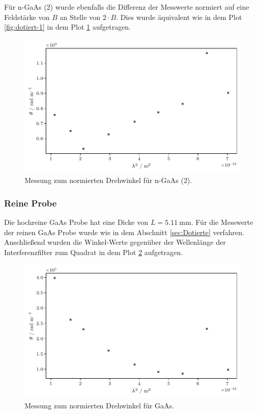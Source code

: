 Für n-GaAs (2) wurde ebenfalls die Differenz der Messwerte normiert auf eine Feldstärke von $B$ an Stelle von $2 \cdot B$.
Dies wurde äquivalent wie in dem Plot \ref{fig:dotiert-1} in dem Plot \ref{fig:dotiert-2} aufgetragen.

\begin{figure}[H]
    \centering
    \includegraphics{build/doped-2.pdf}
    \caption{Messung zum normierten Drehwinkel für n-GaAs (2).}
    \label{fig:dotiert-2}
\end{figure}

\subsubsection{Reine Probe}

Die hochreine GaAs Probe hat eine Dicke von $L = \qty{5.11}{\milli\meter}$.
Für die Messwerte der reinen GaAs Probe wurde wie in dem Abschnitt \ref{sec:Dotierte} verfahren.
Anschließend wurden die Winkel-Werte gegenüber der Wellenlänge der Interferenzfilter zum Quadrat in dem Plot \ref{fig:rein}
aufgetragen.

\begin{figure}[H] 
    \centering
    \includegraphics{build/pure.pdf}
    \caption{Messung zum normierten Drehwinkel für GaAs.}
    \label{fig:rein}
\end{figure}


